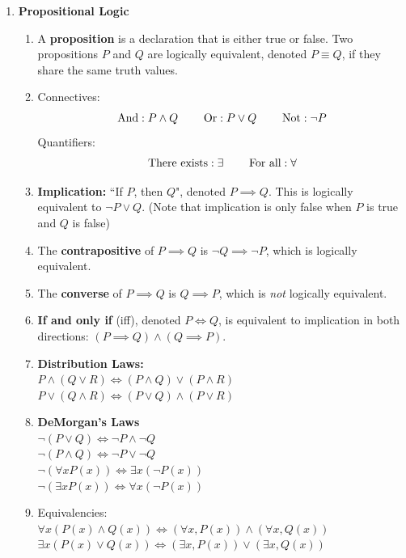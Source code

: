 \documentclass[10pt]{article}
\begin{document}
\begin{multicols}{2}
\begin{enumerate}
    \item \textbf{Propositional Logic}
    \begin{enumerate}
        \item A \textbf{proposition} is a declaration that is either true or false. Two propositions $P$ and $Q$ are logically equivalent, denoted $P \equiv Q$, if they share the same truth values.
        \item Connectives: 
        \begin{align*}
            \text{And}: P \land Q \hspace{8mm} \text{Or}: P \lor Q \hspace{8mm} \text{Not}: \neg P 
        \end{align*}
         Quantifiers: 
         \begin{align*}
             \text{There exists}: \exists \hspace{8mm} \text{For all}: \forall
         \end{align*}
        \item \textbf{Implication:} “If $P$, then $Q$", denoted $P \implies Q$. This is logically equivalent to $\neg P \lor Q$. (Note that implication is only false when $P$ is true and $Q$ is false)
         

        \item The \textbf{contrapositive} of $P \implies Q$ is $\neg Q \implies \neg P$, which is logically equivalent.
        \item The \textbf{converse} of $P \implies Q$ is $Q \implies P$, which is \textit{not} logically equivalent. 
        \item \textbf{If and only if} (iff), denoted $P \iff Q$, is equivalent to implication in both directions: $(P \implies Q) \land (Q \implies P)$.
        \item \textbf{Distribution Laws:} \\ $P \land (Q \lor R) \iff (P \land Q) \lor (P \land R)$ \\
         $P \lor (Q \land R) \iff (P \lor Q) \land (P \lor R)$
        
        \item \textbf{DeMorgan's Laws} \\ $\neg (P \lor Q) \iff \neg P \land \neg Q$ \\
         $\neg (P \land Q) \iff \neg P \lor \neg Q$ \\
         $\neg (\forall x P(x)) \iff \exists x (\neg P(x))$ \\
         $\neg (\exists x P(x)) \iff \forall x (\neg P(x))$ 
        \item Equivalencies: \\
        $\forall x (P(x) \land Q(x)) \iff (\forall x,P(x)) \land (\forall x,Q(x))$ \\
        $\exists x (P(x) \lor Q(x)) \iff (\exists x,P(x)) \lor (\exists x,Q(x))$
    \end{enumerate}
    

\end{enumerate}
\end{multicols}
\end{document}
